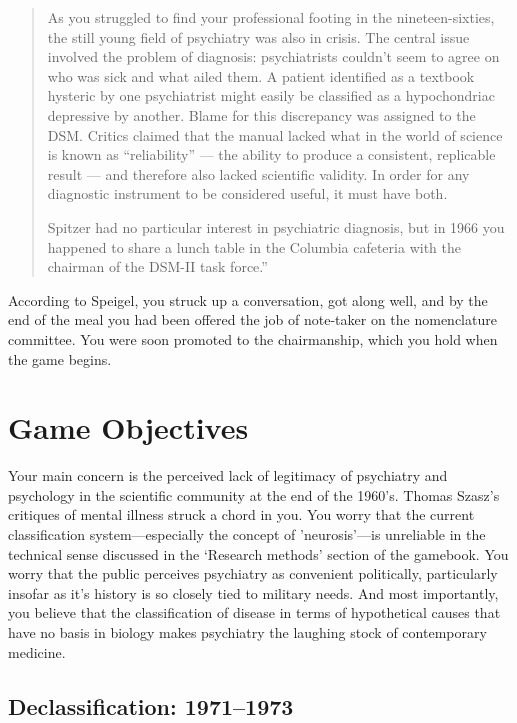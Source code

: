 \begin{refsection}
\begin{quote}
As you struggled to find your professional footing in the nineteen-sixties, the still young field of psychiatry was also in crisis. The central issue involved the problem of diagnosis: psychiatrists couldn’t seem to agree on who was sick and what ailed them. A patient identified as a textbook hysteric by one psychiatrist might easily be classified as a hypochondriac depressive by another. Blame for this discrepancy was assigned to the DSM. Critics claimed that the manual lacked what in the world of science is known as “reliability” — the ability to produce a consistent, replicable result — and therefore also lacked scientific validity. In order for any diagnostic instrument to be considered useful, it must have both.

Spitzer had no particular interest in psychiatric diagnosis, but in 1966 you happened to share a lunch table in the Columbia cafeteria with the chairman of the DSM-II task force.”
\end{quote}

According to Speigel, you struck up a conversation, got along well, and by the end of the meal you had been offered the job of note-taker on the nomenclature committee. You were soon promoted to the chairmanship, which you hold when the game begins.

\section{Game Objectives}
\label{gameobjectives}

Your main concern is the perceived lack of legitimacy of psychiatry and psychology in the scientific community at the end of the 1960's. Thomas Szasz's critiques of mental illness struck a chord in you. You worry that the current classification system—especially the concept of 'neurosis'—is unreliable in the technical sense discussed in the `Research methods' section of the gamebook. You worry that the public perceives psychiatry as convenient politically, particularly insofar as it's history is so closely tied to military needs. And most importantly, you believe that the classification of disease in terms of hypothetical causes that have no basis in biology makes psychiatry the laughing stock of contemporary medicine.

\subsection{Declassification: 1971--1973}
\label{declassification:1971-1973}


\end{refsection}
